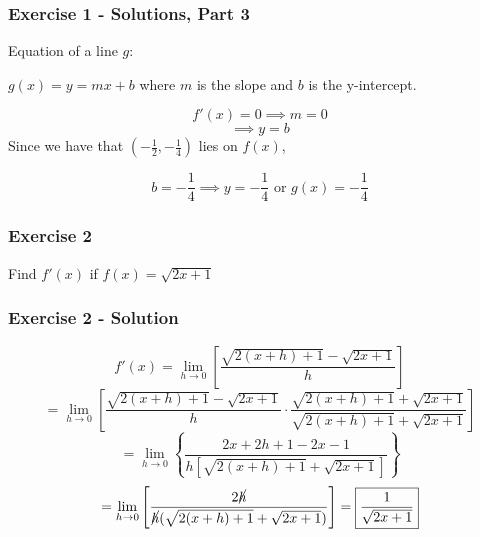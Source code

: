 \documentclass[12pt]{beamer}
\begin{document}
\begin{frame}
	\frametitle{Exercise 1 - Solutions, Part 3}

	Equation of a line $g$:\par
	\begin{center}
		$g(x) = y = mx + b$ where $m$ is the slope and $b$ is the y-intercept.
	\end{center}
	\[f'(x)=0\implies m=0\]
	\[\implies y = b\]
	Since we have that $\left(-\frac{1}{2}, -\frac{1}{4}\right)$ lies on $f(x)$,\par
	\[b = -\frac{1}{4}\implies\boxed{y = -\frac{1}{4}}\text{ or }\boxed{g(x) = -\frac{1}{4}}\]
\end{frame}
\begin{frame}
	\frametitle{Exercise 2}

	\Large
	\begin{center}
		Find $f'(x)$ if $f(x) = \sqrt{2x+1}$
	\end{center}
\end{frame}
\begin{frame}
	\frametitle{Exercise 2 - Solution}

	\[f'(x) = \displaystyle\lim_{h\to 0}\left[\frac{\sqrt{2(x+h)+1}-\sqrt{2x+1}}{h}\right]\]
	\[=\displaystyle\lim_{h\to 0}\left[\frac{\sqrt{2(x+h)+1}-\sqrt{2x+1}}{h}\cdot\frac{\sqrt{2(x+h)+1}+\sqrt{2x+1}}{\sqrt{2(x+h)+1}+\sqrt{2x+1}}\right]\]
	\[=\displaystyle\lim_{h\to 0}\left\{\frac{2x+2h+1-2x-1}{h[\sqrt{2(x+h)+1}+\sqrt{2x+1}]}\right\}\]
	\[=\displaystyle \lim_{{h\to0}}\left[\frac{2\cancel{h}}{\cancel{h}(\sqrt{2(x+h)+1}+\sqrt{2x+1})}\right]=\boxed{\frac{1}{\sqrt{2x+1}}}\]
\end{frame}
\end{document}
